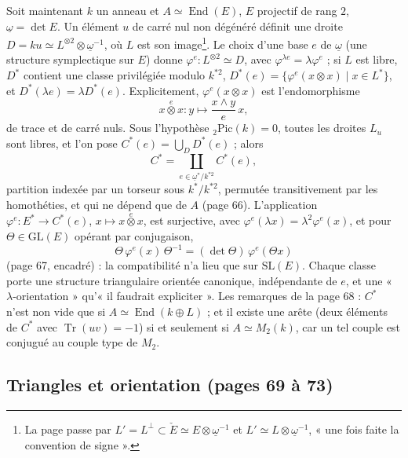 \documentclass[11pt,a4paper]{article}
\begin{document}
Soit maintenant $k$ un anneau et $A \simeq \operatorname{End}(E)$, $E$
projectif de rang $2$, $\underline{\omega} = \det E$. Un élément $u$ de carré nul
non dégénéré définit une droite $D = ku \simeq L^{\otimes 2} \otimes
\underline{\omega}^{-1}$, où $L$ est son image\footnote{La page passe par
$L' = L^{\perp} \subset \check{E} \simeq E \otimes \underline{\omega}^{-1}$ et
$L' \simeq L \otimes \underline{\omega}^{-1}$, « une fois faite la convention de
signe ».}. Le choix d'une base $e$ de $\underline{\omega}$ (une structure
symplectique sur $E$) donne $\varphi^{e} : L^{\otimes 2} \simeq D$, avec
$\varphi^{\lambda e} = \lambda\varphi^{e}$ ; si $L$ est libre, $D^{*}$ contient
une classe privilégiée modulo $k^{*2}$, $D^{*}(e) = \{\varphi^{e}(x \otimes x)
\mid x \in L^{*}\}$, et $D^{*}(\lambda e) = \lambda D^{*}(e)$. Explicitement,
$\varphi^{e}(x \otimes x)$ est l'endomorphisme
\[
  x \overset{e}{\otimes} x : y \longmapsto \frac{x \wedge y}{e}\,x ,
\]
de trace et de carré nuls. Sous l'hypothèse ${}_2\mathrm{Pic}(k) = 0$, toutes
les droites $L_u$ sont libres, et l'on pose $C^{*}(e) = \bigcup_D D^{*}(e)$ ;
alors
\[
  C^{*} = \coprod_{e \in \underline{\omega}^{*}/k^{*2}} C^{*}(e),
\]
partition indexée par un torseur sous $k^{*}/k^{*2}$, permutée transitivement
par les homothéties, et qui ne dépend que de $A$ (page 66). L'application
$\varphi^{e} : E^{*} \to C^{*}(e)$, $x \mapsto x \overset{e}{\otimes} x$, est
surjective, avec $\varphi^{e}(\lambda x) = \lambda^2\varphi^{e}(x)$, et pour
$\Theta \in \mathrm{GL}(E)$ opérant par conjugaison,
\[
  \Theta\,\varphi^{e}(x)\,\Theta^{-1} = (\det\Theta)\,\varphi^{e}(\Theta x)
\]
(page 67, encadré) : la compatibilité n'a lieu que sur $\mathrm{SL}(E)$.
Chaque classe porte une structure triangulaire orientée canonique,
indépendante de $e$, et une « $\lambda$-orientation » qu'« il faudrait
expliciter ». Les remarques de la page 68 : $C^{*}$ n'est non vide que si $A
\simeq \operatorname{End}(k \oplus L)$ ; et il existe une arête (deux éléments
de $C^{*}$ avec $\operatorname{Tr}(uv) = -1$) si et seulement si $A \simeq
M_2(k)$, car un tel couple est conjugué au couple type de $M_2$.

\subsection*{Triangles et orientation (pages 69 à 73)}
\end{document}
